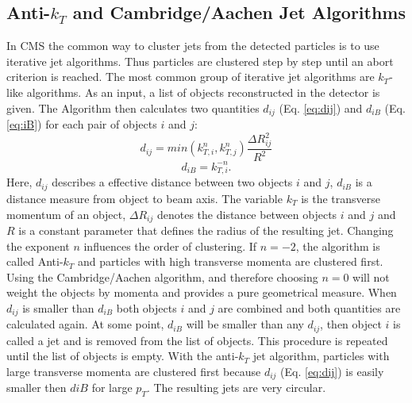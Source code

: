 \subsection{Anti-$k_T$ and Cambridge/Aachen Jet Algorithms}
	In CMS the common way to cluster jets from the detected particles is to use iterative jet algorithms. Thus particles are clustered step by step until an abort criterion is reached. The most common group of iterative jet algorithms are $k_T$-like algorithms. As an input, a list of objects reconstructed in the detector is given. The Algorithm then calculates two quantities $d_{ij}$ (Eq. \ref{eq:dij}) and $d_{iB}$ (Eq. \ref{eq:iB}) for each pair of objects $i$ and $j$:
	\begin{equation}
	d_{ij} = min (k_{T,i}^{n}, k_{T,j}^{n})  \frac{\Delta R_{ij}^2}{R^2}
	\label{eq:dij}
	\end{equation}
	\begin{equation}
	d_{iB} = k_{T,i}^{-n}.
	\label{eq:iB}
	\end{equation}
	Here, $d_{ij}$ describes a effective distance between two objects $i$ and $j$, $d_{iB}$ is a distance measure from object to beam axis. The variable $k_T$ is the transverse momentum of an object, $\Delta R_{ij}$ denotes the distance between objects $i$ and $j$ and $R$ is a constant parameter that defines the radius of the resulting jet. Changing the exponent $n$ influences the order of clustering. If $n=-2$, the algorithm is called Anti-$k_T$ \cite{antikt} and particles with high transverse momenta are clustered first. Using the Cambridge/Aachen \cite{CA1, CA2} algorithm, and therefore choosing $n=0$ will not weight the objects by momenta and provides a pure geometrical measure. When $d_{ij}$ is smaller than $d_{iB}$ both objects $i$ and $j$ are combined and both quantities are calculated again. At some point, $d_{iB}$ will be smaller than any $d_{ij}$, then object $i$ is called a jet and is removed from the list of objects. This procedure is repeated until the list of objects is empty. With the anti-$k_T$ jet algorithm, particles with large transverse momenta are clustered first because $d_{ij}$ (Eq. \ref{eq:dij}) is easily smaller then $d{iB}$ for large $p_T$. The resulting jets are very circular. 

